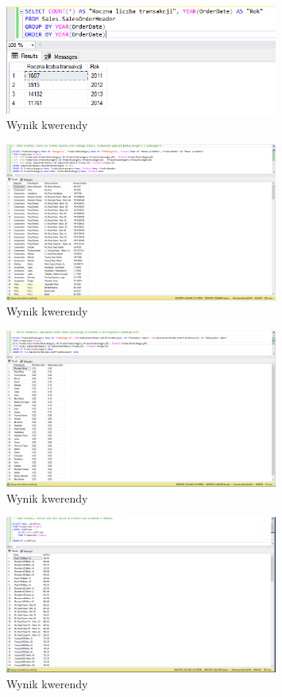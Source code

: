 \documentclass[a4paper,12pt]{article}
\begin{document}
\begin{figure}[H]
    \centering
    \includegraphics[width=0.8\textwidth]{images/05.png}
    \caption{Wynik kwerendy}
    \end{figure}

\begin{figure}[H]
    \centering
    \includegraphics[width=0.8\textwidth]{images/06.png}
    \caption{Wynik kwerendy}
    \end{figure}

\begin{figure}[H]
    \centering
    \includegraphics[width=0.8\textwidth]{images/07.png}
    \caption{Wynik kwerendy}
    \end{figure}

\begin{figure}[H]
    \centering
    \includegraphics[width=0.8\textwidth]{images/08.png}
    \caption{Wynik kwerendy}
    \end{figure}
\end{document}
